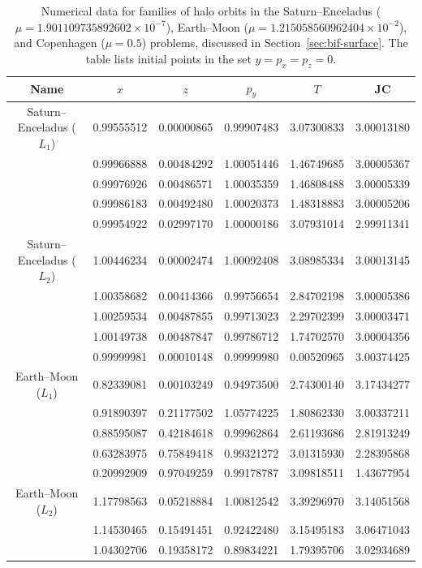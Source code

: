 \documentclass[pdflatex,sn-mathphys-ay]{sn-jnl}%
\theoremstyle{thmstyleone}%
\theoremstyle{thmstyletwo}%
\theoremstyle{thmstylethree}%
\begin{document}
\begin{table}[!h]
\centering
\caption{
Numerical data for families of halo orbits in the Saturn--Enceladus ($\mu=1.901109735892602 \times 10^{-7}$), Earth--Moon ($\mu=1.215058560962404 \times 10^{-2}$), and Copenhagen ($\mu=0.5$) problems, discussed in Section~\ref{sec:bif-surface}.
The table lists initial points in the set $y = p_x = p_z = 0$.
}
\scriptsize
\label{tbl:data-halo}
\begin{tabular}{cccccc}
\toprule
Name & $x$ & $z$ & $p_y$ & $T$ & JC \\ 
\midrule
\midrule
Saturn--Enceladus ($L_1$) & 0.99555512 & 0.00000865 & 0.99907483 & 3.07300833 & 3.00013180 \\
 & 0.99966888 & 0.00484292 & 1.00051446 & 1.46749685 & 3.00005367 \\
 & 0.99976926 & 0.00486571 & 1.00035359 & 1.46808488 & 3.00005339 \\
 & 0.99986183 & 0.00492480 & 1.00020373 & 1.48318883 & 3.00005206 \\
 & 0.99954922 & 0.02997170 & 1.00000186 & 3.07931014 & 2.99911341 \\
\midrule
Saturn--Enceladus ($L_2$) & 1.00446234 & 0.00002474 & 1.00092408 & 3.08985334 & 3.00013145 \\
 & 1.00358682 & 0.00414366 & 0.99756654 & 2.84702198 & 3.00005386 \\
 & 1.00259534 & 0.00487855 & 0.99713023 & 2.29702399 & 3.00003471 \\
 & 1.00149738 & 0.00487847 & 0.99786712 & 1.74702570 & 3.00004356 \\
 & 0.99999981 & 0.00010148 & 0.99999980 & 0.00520965 & 3.00374425 \\
\midrule
Earth--Moon ($L_1$) & 0.82339081 & 0.00103249 & 0.94973500 & 2.74300140 & 3.17434277 \\
 & 0.91890397 & 0.21177502 & 1.05774225 & 1.80862330 & 3.00337211 \\
 & 0.88595087 & 0.42184618 & 0.99962864 & 2.61193686 & 2.81913249 \\
 & 0.63283975 & 0.75849418 & 0.99321272 & 3.01315930 & 2.28395868 \\
 & 0.20992909 & 0.97049259 & 0.99178787 & 3.09818511 & 1.43677954 \\
\midrule
Earth--Moon ($L_2$) & 1.17798563 & 0.05218884 & 1.00812542 & 3.39296970 & 3.14051568 \\
 & 1.14530465 & 0.15491451 & 0.92422480 & 3.15495183 & 3.06471043 \\
 & 1.04302706 & 0.19358172 & 0.89834221 & 1.79395706 & 3.02934689 \\

\end{tabular}
\end{table}
\end{document}
